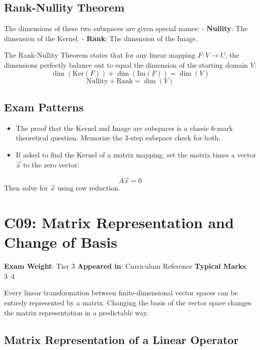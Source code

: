 \documentclass[
]{article}
\providecommand{\tightlist}{%
  \setlength{\itemsep}{0pt}\setlength{\parskip}{0pt}}
\renewenvironment{quote}
  {\begin{tcolorbox}[
     colback=calloutbg,
     colframe=calloutframe,
     colupper=callouttext,
     arc=3pt,
     boxrule=0.5pt,
     leftrule=0.5pt,
     borderline west={3pt}{0pt}{calloutaccent},
     left=8pt,
     right=8pt,
     top=6pt,
     bottom=6pt
   ]}
  {\end{tcolorbox}}
\begin{document}
\subsection{Rank-Nullity Theorem}\label{rank-nullity-theorem}

The dimensions of these two subspaces are given special names: -
\textbf{Nullity}: The dimension of the Kernel. - \textbf{Rank}: The
dimension of the Image.

The Rank-Nullity Theorem states that for any linear mapping
\(F: V \to U\), the dimensions perfectly balance out to equal the
dimension of the starting domain \(V\):
\[
\dim(\text{Ker}(F)) + \dim(\text{Im}(F)) = \dim(V)
\]
\[
\text{Nullity} + \text{Rank} = \dim(V)
\]

\subsection{Exam Patterns}\label{exam-patterns-36}

\begin{itemize}
\tightlist
\item
  The proof that the Kernel and Image are subspaces is a classic 6-mark
  theoretical question. Memorize the 3-step subspace check for both.
\item
  If asked to find the Kernel of a matrix mapping, set the matrix times
  a vector \(\vec{x}\) to the zero vector:
\end{itemize}
\[
A\vec{x} = 0
\]
Then solve for \(\vec{x}\) using row reduction.

\section{C09: Matrix Representation and Change of
Basis}\label{c09-matrix-representation-and-change-of-basis}

\begin{quote}
\textbf{Exam Weight}: Tier 3 \textbar{} \textbf{Appeared in}: Curriculum
Reference \textbar{} \textbf{Typical Marks}: 3--4
\end{quote}

Every linear transformation between finite-dimensional vector spaces can
be entirely represented by a matrix. Changing the basis of the vector
space changes the matrix representation in a predictable way.

\subsection{Matrix Representation of a Linear
Operator}\label{matrix-representation-of-a-linear-operator}
\end{document}
